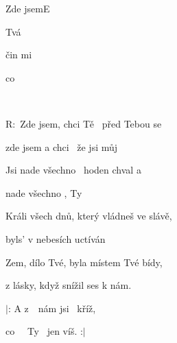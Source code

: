 \pagebreak
\begin{song}{Zde jsem}{E}{}

\begin{SBVerse}

 Tvá  

čin mi 

 co   

  

\end{SBVerse}

\begin{SBChorus}

R: Zde jsem, chci Tě  před Tebou se 

zde jsem a chci  že jsi můj 

Jsi nade všechno  hoden chval a 

nade všechno , Ty 

\end{SBChorus}

\begin{SBVerse}

Králi všech dnů, který vládneš ve slávě, 

byls' v nebesích uctíván

Zem, dílo Tvé, byla místem Tvé bídy, 

z lásky, když snížil ses k nám.

\end{SBVerse}

\begin{SBChorus*}

$|$: A z  nám jsi  kříž,

co   Ty  jen víš. :$|$

\end{SBChorus*}

\end{song}